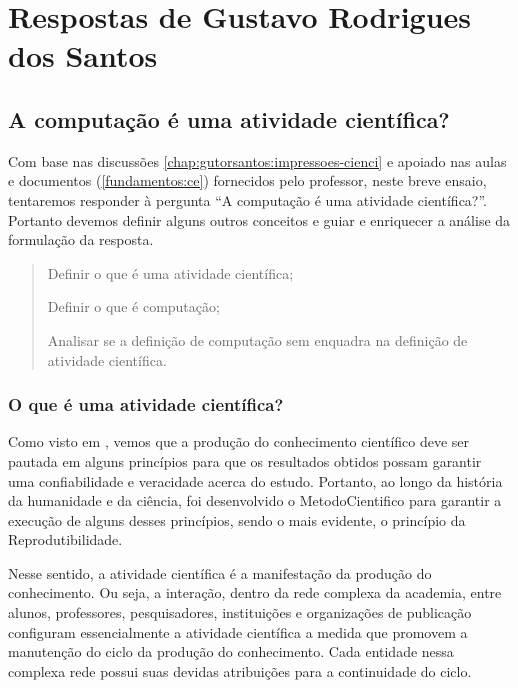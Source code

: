 \section{Respostas de Gustavo Rodrigues dos Santos\label{tarefa-gutorsantos-tarefa-5-1}}

\subsection{A computação é uma atividade científica?}

Com base nas discussões \ref{chap:gutorsantos:impressoes-cienci} e apoiado nas aulas e documentos (\ref{fundamentos:ce}) fornecidos pelo professor, neste breve ensaio, tentaremos responder à pergunta ``A computação é uma atividade científica?''. Portanto devemos definir alguns outros conceitos e guiar e enriquecer a análise da formulação da resposta.

\begin{quote}
Definir o que é uma atividade científica;

Definir o que é computação;

Analisar se a definição de computação sem enquadra na definição de atividade científica. 
\end{quote}

\subsubsection{O que é uma atividade científica?} 

Como visto em \cite{fernandes_consideracoes_2021}, vemos que a produção do conhecimento científico deve ser pautada em alguns princípios para que os resultados obtidos possam garantir uma confiabilidade e veracidade acerca do estudo. Portanto, ao longo da história da humanidade e da ciência, foi desenvolvido o \gls{MetodoCientifico} para garantir a execução de alguns desses princípios, sendo o mais evidente, o princípio da Reprodutibilidade.

Nesse sentido, a atividade científica é a manifestação da produção do conhecimento. Ou seja, a interação, dentro da rede complexa da academia, entre alunos, professores, pesquisadores, instituições e organizações de publicação configuram essencialmente a atividade científica a medida que promovem a manutenção do ciclo da produção do conhecimento. Cada entidade nessa complexa rede possui suas devidas atribuições para a continuidade do ciclo. 

